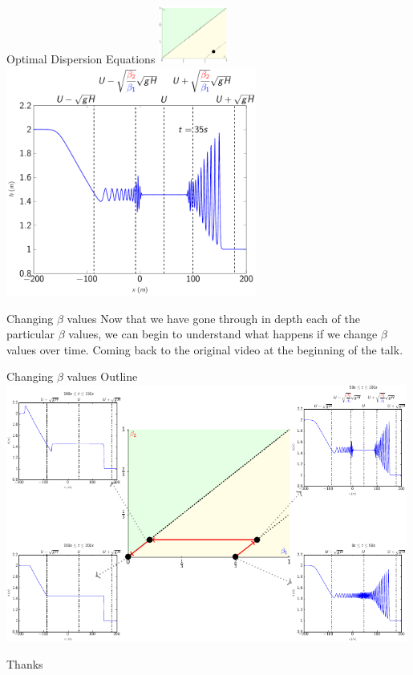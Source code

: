 \documentclass[pdf]{beamer}
\begin{document}
\begin{frame}{Optimal Dispersion Equations \hfill \includegraphics[width=0.17\textwidth]{./Pics/Tex/Explanatory/RegionsPlot/SPiSGN.pdf}}
\centering
\includegraphics[width=0.62\textwidth]{./Pics/Tex/Results/DB/iSGN/RegioniSGN.pdf}
\end{frame}

\begin{frame}{Changing $\beta$ values}
Now that we have gone through in depth each of the particular $\beta$ values, we can begin to understand what happens if we change $\beta$ values over time. Coming back to the original video at the beginning of the talk.
\end{frame}

\begin{frame}{Changing $\beta$ values Outline}
\centering
\includegraphics[width=0.99\textwidth]{./Pics/Tex/Explanatory/RegDBV/3x3Grid.pdf}
\end{frame}

\begin{frame}[plain]{}
\end{frame}

\begin{frame}
Thanks\end{frame}
\end{document}
